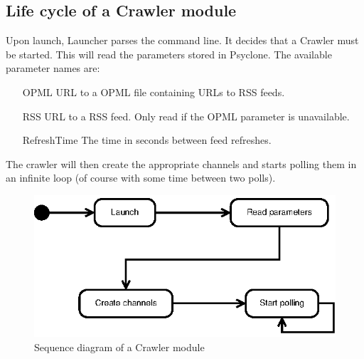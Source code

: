 \subsection{Life cycle of a Crawler module}

Upon launch, Launcher parses the command line. It decides that a Crawler must
be started. This will read the parameters stored in Psyclone. The available parameter names are:

\begin{itemize}
 \item[OPML] URL to a OPML file containing URLs to RSS feeds.
 \item[RSS] URL to a RSS feed. Only read if the OPML parameter is unavailable.
 \item[RefreshTime] The time in seconds between feed refreshes.
\end{itemize}

The crawler will then create the appropriate channels and starts polling them
in an infinite loop (of course with some time between two polls).

\begin{figure}[htp]
  \centering
  \includegraphics{image/sequence-diagram-crawler}
  \caption{Sequence diagram of a Crawler module}
\end{figure}
